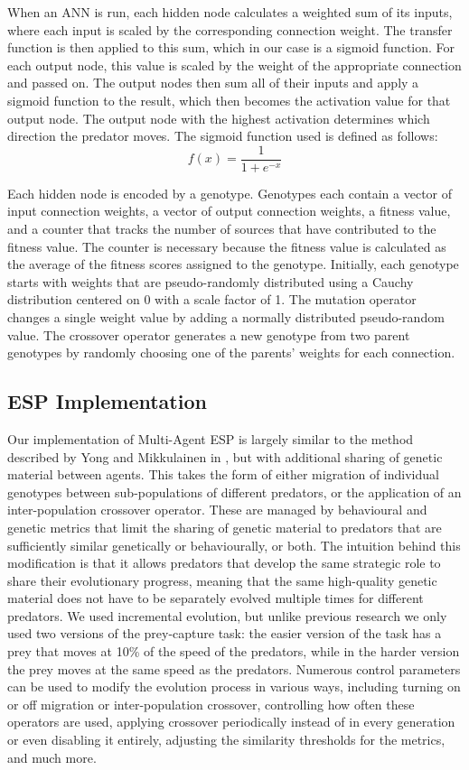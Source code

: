 \documentclass[12pt]{article} %
\begin{document}
When an ANN is run, each hidden node calculates a weighted sum of its inputs, where each input is scaled by the corresponding connection weight. The transfer function is then applied to this sum, which in our case is a sigmoid function. For each output node, this value is scaled by the weight of the appropriate connection and passed on. The output nodes then sum all of their inputs and apply a sigmoid function to the result, which then becomes the activation value for that output node. The output node with the highest activation determines which direction the predator moves. The sigmoid function used is defined as follows:
\[
f(x) = \frac{1}{1 + e^{-x}}
\]

Each hidden node is encoded by a genotype. Genotypes each contain a vector of input connection weights, a vector of output connection weights, a fitness value, and a counter that tracks the number of sources that have contributed to the fitness value. The counter is necessary because the fitness value is calculated as the average of the fitness scores assigned to the genotype. Initially, each genotype starts with weights that are pseudo-randomly distributed using a Cauchy distribution \cite{Rudolph1997} centered on 0 with a scale factor of 1. The mutation operator changes a single weight value by adding a normally distributed pseudo-random value. The crossover operator generates a new genotype from two parent genotypes by randomly choosing one of the parents' weights for each connection.

\subsection{ESP Implementation}

Our implementation of Multi-Agent ESP is largely similar to the method described by Yong and Mikkulainen in \cite{Yong2001}, but with additional sharing of genetic material between agents. This takes the form of either migration of individual genotypes between sub-populations of different predators, or the application of an inter-population crossover operator. These are managed by behavioural and genetic metrics that limit the sharing of genetic material to predators that are sufficiently similar genetically or behaviourally, or both. The intuition behind this modification is that it allows predators that develop the same strategic role to share their evolutionary progress, meaning that the same high-quality genetic material does not have to be separately evolved multiple times for different predators. We used incremental evolution, but unlike previous research we only used two versions of the prey-capture task: the easier version of the task has a prey that moves at 10\% of the speed of the predators, while in the harder version the prey moves at the same speed as the predators. Numerous control parameters can be used to modify the evolution process in various ways, including turning on or off migration or inter-population crossover, controlling how often these operators are used, applying crossover periodically instead of in every generation or even disabling it entirely, adjusting the similarity thresholds for the metrics, and much more.
\end{document}
